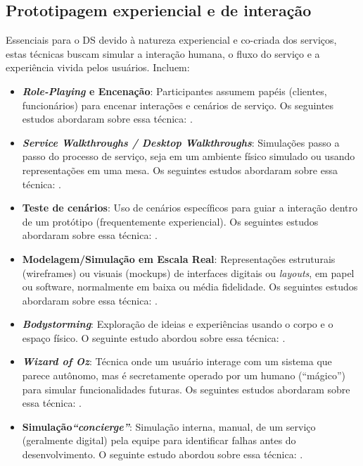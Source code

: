\subsection{Prototipagem experiencial e de interação}

Essenciais para o DS devido à natureza experiencial e co-criada dos serviços, estas técnicas buscam simular a interação humana, o fluxo do serviço e a experiência vivida pelos usuários. Incluem:

\begin{itemize}
	\item \textbf{\textit{Role-Playing} e Encenação}: Participantes assumem papéis (clientes, funcionários) para encenar interações e cenários de serviço. Os seguintes estudos abordaram sobre essa técnica: .
	
	\item \textbf{\textit{Service Walkthroughs / Desktop Walkthroughs}}: Simulações passo a passo do processo de serviço, seja em um ambiente físico simulado ou usando representações em uma mesa. Os seguintes estudos abordaram sobre essa técnica: .
	
	\item \textbf{Teste de cenários}: Uso de cenários específicos para guiar a interação dentro de um protótipo (frequentemente experiencial). Os seguintes estudos abordaram sobre essa técnica: .
	
	\item \textbf{Modelagem/Simulação em Escala Real}: Representações estruturais (wireframes) ou visuais (mockups) de interfaces digitais ou \textit{layouts}, em papel ou software, normalmente em baixa ou média fidelidade. Os seguintes estudos abordaram sobre essa técnica: .
	
	\item \textbf{\textit{Bodystorming}}: Exploração de ideias e experiências usando o corpo e o espaço físico. O seguinte estudo abordou sobre essa técnica: .
	
	\item \textbf{\textit{Wizard of Oz}}: Técnica onde um usuário interage com um sistema que parece autônomo, mas é secretamente operado por um humano (``mágico'') para simular funcionalidades futuras. Os seguintes estudos abordaram sobre essa técnica: .
	
	\item \textbf{Simulação\textit{``concierge''}}: Simulação interna, manual, de um serviço (geralmente digital) pela equipe para identificar falhas antes do desenvolvimento. O seguinte estudo abordou sobre essa técnica: .
\end{itemize}

